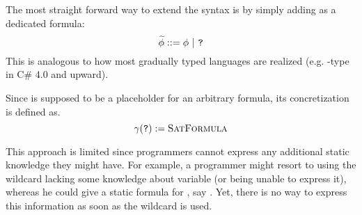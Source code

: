 
The most straight forward way to extend the syntax is by simply adding \qm as a dedicated formula:
\begin{displaymath}
\widetilde{\phi} ::= \phi ~|~ \texttt{?}
\end{displaymath}
This is analogous to how most gradually typed languages are realized (e.g. -type in C\# 4.0 and upward).

Since \qm is supposed to be a placeholder for an arbitrary formula, its concretization is defined as.
\begin{displaymath}
\gamma(\texttt{?}) := \textsc{SatFormula}
\end{displaymath}


This approach is limited since programmers cannot express any additional static knowledge they might have.
For example, a programmer might resort to using the wildcard lacking some knowledge about variable  (or being unable to express it), whereas he could give a static formula for , say .
Yet, there is no way to express this information as soon as the wildcard is used.